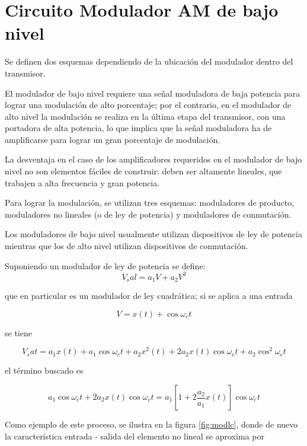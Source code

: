 \documentclass[12pt,letterpaper,titlepage,twoside]{book}
\begin{document}
\section{Circuito Modulador AM de bajo nivel}

Se definen dos esquemas dependiendo de la ubicación del modulador dentro del transmisor.

El modulador de bajo nivel requiere una señal moduladora de baja potencia para lograr una modulación de alto porcentaje; por el contrario, en el modulador de alto nivel la modulación se realiza en la última etapa del transmisor, con una portadora de alta potencia, lo que implica que la señal moduladora ha de amplificarse para lograr un gran porcentaje de modulación.

La desventaja en el caso de los amplificadores requeridos en el modulador de bajo nivel no son elementos fáciles de construir: deben ser altamente lineales, que trabajen a alta frecuencia y gran potencia. 

Para lograr la modulación, se utilizan tres esquemas: moduladores de producto, moduladores no lineales (o de ley de potencia) y moduladores de conmutación.

Los moduladores de bajo nivel usualmente utilizan dispositivos de ley de potencia mientras que los de alto nivel utilizan dispositivos de conmutación.

Suponiendo un modulador de ley de potencia se define:
\begin{equation}
V_sal = a_1 V+ a_2 V^2
\end{equation}

que en particular es un modulador de ley cuadrática; si se aplica a una entrada

\begin{equation}
V = x(t) + \cos \omega_c t
\end{equation}

se tiene

\begin{equation}
V_sat  =  a_1 x(t) + a_1 \cos \omega_c t + a_2 x^2(t)+ 2a_2 x(t) \cos \omega_c t +a_2 \cos^2 \omega_c t
\end{equation}

el término buscado es 

\begin{equation}
a_1 \cos \omega_c t + 2 a_2 x(t) \cos \omega_c t = a_1 \left[ 1 + 2 \frac{a_2}{a_1} x(t) \right] \cos \omega_c t
\end{equation}

Como ejemplo de este proceso, se ilustra en la figura \ref{fig:modlc}, donde de nuevo la característica entrada - salida del elemento no lineal se aproxima por
\end{document}

